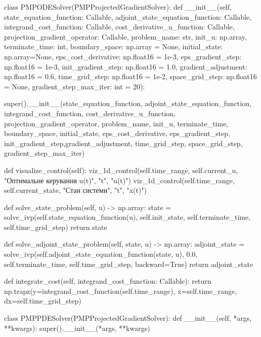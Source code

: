 \documentclass[a4paper,12pt]{extreport}
\begin{document}
\begin{python}[utf8]
    
class PMPODESolver(PMPProjectedGradientSolver):
        def __init__(self, state_equation_function: Callable, adjoint_state_equation_function: Callable,
                     integrand_cost_function: Callable, cost_derivative_u_function: Callable,
                     projection_gradient_operator: Callable, problem_name: str, init_u: np.array,
                     terminate_time: int, boundary_space: np.array = None, initial_state: np.array=None,
                     eps_cost_derivative: np.float16 = 1e-3, eps_gradient_step: np.float16 = 1e-3,
                     init_gradient_step: np.float16 = 1.0, gradient_adjustment: np.float16 = 0.6,
                     time_grid_step: np.float16 = 1e-2, space_grid_step: np.float16 = None,
                     gradient_step_max_iter: int = 20):
    
            super().__init__(state_equation_function, adjoint_state_equation_function,
                     integrand_cost_function, cost_derivative_u_function,
                     projection_gradient_operator, problem_name, init_u,
                     terminate_time, boundary_space, initial_state,
                     eps_cost_derivative, eps_gradient_step,
                     init_gradient_step,gradient_adjustment,
                     time_grid_step, space_grid_step,
                     gradient_step_max_iter)
    
        def visualize_control(self):
            viz_1d_control(self.time_range, self.current_u, "Оптимальне керування u(t)", "t", "u(t)")
            viz_1d_control(self.time_range, self.current_state, "Стан системи", "t", "x(t)")
    
        def solve_state_problem(self, u) -> np.array:
            state = solve_ivp(self.state_equation_function(u), self.init_state, self.terminate_time, self.time_grid_step)
            return state
    
        def solve_adjoint_state_problem(self, state, u) -> np.array:
            adjoint_state = solve_ivp(self.adjoint_state_equation_function(state, u), 0.0,
                                      self.terminate_time, self.time_grid_step, backward=True)
            return adjoint_state
    
        def integrate_cost(self, integrand_cost_function: Callable):
            return np.trapz(y=integrand_cost_function(self.time_range), x=self.time_range, dx=self.time_grid_step)
    
    
class PMPPDESolver(PMPProjectedGradientSolver):
        def __init__(self, *args, **kwargs):
            super().__init__(*args, **kwargs)
    

\end{python}
\end{document}
